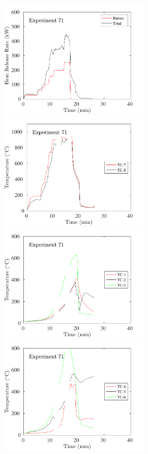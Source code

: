 \begin{figure}[H]
\includegraphics[height=2.30in]{../SCRIPT_FIGURES/Test_71_HRR} \hfill
\includegraphics[height=2.30in]{../SCRIPT_FIGURES/Test_71_TC_7-8} \\
\includegraphics[height=2.30in]{../SCRIPT_FIGURES/Test_71_TC_1-3} \hfill
\includegraphics[height=2.30in]{../SCRIPT_FIGURES/Test_71_TC_4-6}

\end{figure}
